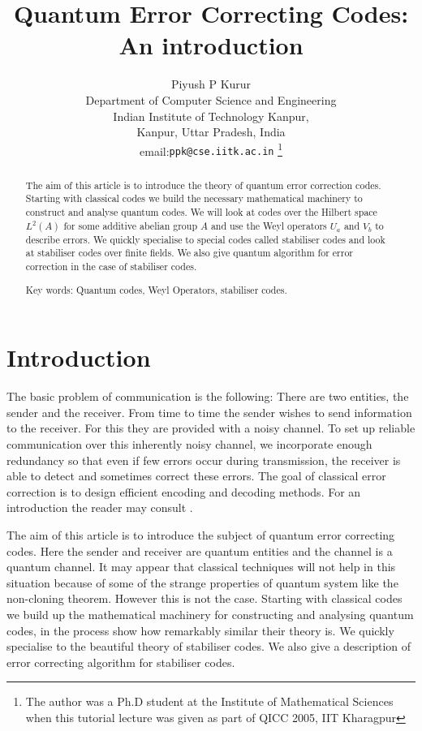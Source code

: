 \documentclass[11pt,twoside]{article}
\author{Piyush P Kurur\\
  Department of Computer Science and Engineering\\
  Indian Institute of Technology Kanpur,\\
  Kanpur, Uttar Pradesh, India\\
  email:{\tt ppk@cse.iitk.ac.in}
  \thanks{The author was a Ph.D student at the Institute of
Mathematical Sciences when this tutorial lecture was given as part of
QICC 2005, IIT Kharagpur} 
}
\date{}
\title{Quantum Error Correcting Codes: An introduction}
\theoremstyle{definition}
\theoremstyle{remark}
\begin{document}
\maketitle


\begin{abstract}

The aim of this article is to introduce the theory of quantum error
correction codes. Starting with classical codes we build the necessary
mathematical machinery to construct and analyse quantum codes. We will
look at codes over the Hilbert space $L^2(A)$ for some additive
abelian group $A$ and use the Weyl operators $U_a$ and $V_b$ to
describe errors. We quickly specialise to special codes called
stabiliser codes and look at stabiliser codes over finite fields. We
also give quantum algorithm for error correction in the case of
stabiliser codes.

Key words: Quantum codes, Weyl Operators, stabiliser codes.

\end{abstract}

\section{Introduction}

The basic problem of communication is the following: There are two
entities, the sender and the receiver. From time to time the sender
wishes to send information to the receiver. For this they are provided
with a noisy channel. To set up reliable communication over this
inherently noisy channel, we incorporate enough redundancy so that
even if few errors occur during transmission, the receiver is able to
detect and sometimes correct these errors. The goal of classical error
correction is to design efficient encoding and decoding methods. For
an introduction the reader may consult \cite{vLin}.

The aim of this article is to introduce the subject of quantum error
correcting codes. Here the sender and receiver are quantum entities
and the channel is a quantum channel. It may appear that classical
techniques will not help in this situation because of some of the
strange properties of quantum system like the non-cloning theorem.
However this is not the case. Starting with classical codes we build
up the mathematical machinery for constructing and analysing quantum
codes, in the process show how remarkably similar their theory is.  We
quickly specialise to the beautiful theory of stabiliser codes.  We
also give a description of error correcting algorithm for stabiliser
codes.
\end{document}
